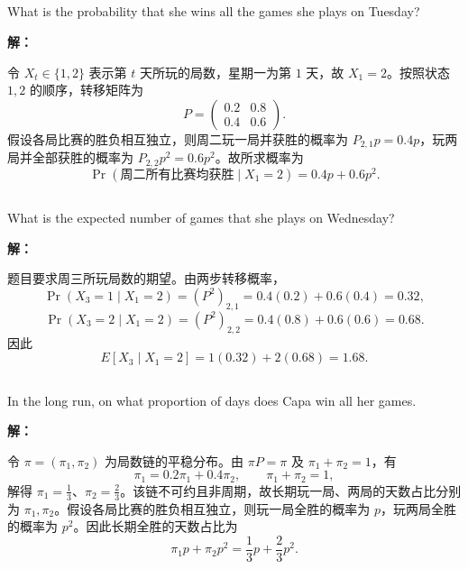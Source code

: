 \documentclass[12pt,a4paper]{article}
\begin{document}
\subsection{}
 What is the probability that she wins all the games she plays on Tuesday?

\begin{answerbox}
\textbf{解：}

令 $X_t\in\{1,2\}$ 表示第 $t$ 天所玩的局数，星期一为第 $1$ 天，故 $X_1=2$。按照状态 $1,2$ 的顺序，转移矩阵为
\[
P=\begin{pmatrix}0.2&0.8\\0.4&0.6\end{pmatrix}.
\]
假设各局比赛的胜负相互独立，则周二玩一局并获胜的概率为 $P_{2,1}p=0.4p$，玩两局并全部获胜的概率为 $P_{2,2}p^2=0.6p^2$。故所求概率为
\[
\Pr(\text{周二所有比赛均获胜}\mid X_1=2)=0.4p+0.6p^2.
\]
\end{answerbox}

\subsection{}
 What is the expected number of games that she plays on Wednesday?

\begin{answerbox}
\textbf{解：}

题目要求周三所玩局数的期望。由两步转移概率，
\[
\Pr(X_3=1\mid X_1=2)=(P^2)_{2,1}=0.4(0.2)+0.6(0.4)=0.32,
\]
\[
\Pr(X_3=2\mid X_1=2)=(P^2)_{2,2}=0.4(0.8)+0.6(0.6)=0.68.
\]
因此
\[
E[X_3\mid X_1=2]=1(0.32)+2(0.68)=1.68.
\]
\end{answerbox}

\subsection{}

 In the long run, on what proportion of days does Capa win all her games.

\begin{answerbox}
\textbf{解：}

令 $\pi=(\pi_1,\pi_2)$ 为局数链的平稳分布。由 $\pi P=\pi$ 及 $\pi_1+\pi_2=1$，有
\[
\pi_1=0.2\pi_1+0.4\pi_2,
\qquad \pi_1+\pi_2=1,
\]
解得 $\pi_1=\frac13$、$\pi_2=\frac23$。该链不可约且非周期，故长期玩一局、两局的天数占比分别为 $\pi_1,\pi_2$。假设各局比赛的胜负相互独立，则玩一局全胜的概率为 $p$，玩两局全胜的概率为 $p^2$。因此长期全胜的天数占比为
\[
\pi_1p+\pi_2p^2=\frac13p+\frac23p^2.
\]
\end{answerbox}
\end{document}
